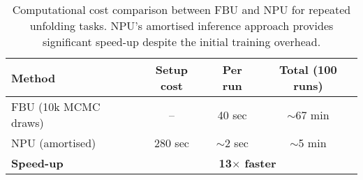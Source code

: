 \begin{table}
\centering
\caption[Computational cost comparison between FBU and NPU]{Computational cost comparison between FBU and NPU for repeated unfolding tasks. NPU's amortised inference approach provides significant speed-up despite the initial training overhead.}
\vspace{3mm}
\label{tab:timing}
\begin{tabular}{|l|c|c|c|}
\hline
\textbf{Method} & \textbf{Setup cost} & \textbf{Per run} & \textbf{Total (100 runs)} \\
\hline
FBU (10k MCMC draws) & -- & 40 sec & $\sim$67 min \\
NPU (amortised) & 280 sec & $\sim$2 sec & $\sim$5 min \\
\hline
\textbf{Speed-up} & \multicolumn{3}{c|}{\textbf{13$\times$ faster}} \\
\hline
\end{tabular}
\end{table}